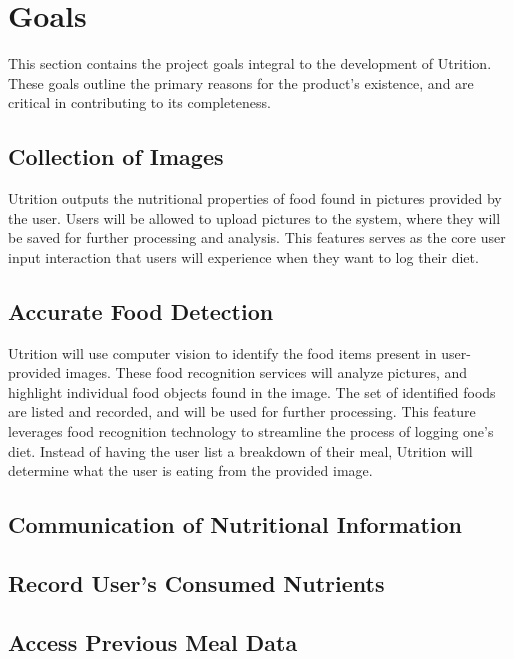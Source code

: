 \documentclass{article}
\begin{document}

\section{Goals}

This section contains the project goals integral to the development of 
Utrition. These goals outline the primary reasons for the product's existence, 
and are critical in contributing to its completeness.

\subsection{Collection of Images}

Utrition outputs the nutritional properties of food found in pictures 
provided by the user. Users will be allowed to upload pictures to the system, 
where they will be saved for further processing and analysis. This features 
serves as the core user input interaction that users will experience when they 
want to log their diet.

\subsection{Accurate Food Detection}

Utrition will use computer vision to identify the food items present in 
user-provided images. These food recognition services will analyze pictures, 
and highlight individual food objects found in the image. The set of identified 
foods are listed and recorded, and will be used for further processing. This 
feature leverages food recognition technology to streamline the process of 
logging one's diet. Instead of having the user list a breakdown of their meal, 
Utrition will determine what the user is eating from the provided image.

\subsection{Communication of Nutritional Information}

\subsection{Record User's Consumed Nutrients}

\subsection{Access Previous Meal Data}
\end{document}
